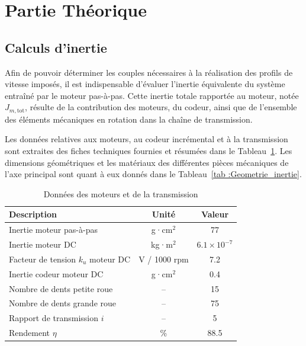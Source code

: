 \section{Partie Théorique}
\subsection{Calculs d'inertie}
Afin de pouvoir déterminer les couples nécessaires à la réalisation des profils de vitesse imposés, il est indispensable d’évaluer l’inertie équivalente du système entraîné par le moteur pas-à-pas. Cette inertie totale rapportée au moteur, notée $J_{m,\text{tot}}$, résulte de la contribution des moteurs, du codeur, ainsi que de l’ensemble des éléments mécaniques en rotation dans la chaîne de transmission.

Les données relatives aux moteurs, au codeur incrémental et à la transmission sont extraites des fiches techniques fournies et résumées dans le Tableau~\ref{tab :donnees_moteur}. Les dimensions géométriques et les matériaux des différentes pièces mécaniques de l’axe principal sont quant à eux donnés dans le Tableau~\ref{tab :Geometrie_inertie}.
\begin{table}[h!]
\centering
\begin{tabular}{|l| c| c|}
\hline
Description & Unité & Valeur \\
\hline
Inertie moteur pas-à-pas & g·cm$^2$ & 77 \\
\hline
Inertie moteur DC & kg·m$^2$ & $6.1 \times 10^{-7}$ \\
\hline
Facteur de tension $k_u$ moteur DC & V / 1000 rpm & 7.2 \\
\hline
Inertie codeur moteur DC & g·cm$^2$ & 0.4 \\
\hline
Nombre de dents petite roue & -- & 15 \\
\hline
Nombre de dents grande roue & -- & 75 \\
\hline
Rapport de transmission $i$ & -- & 5 \\
\hline
Rendement $\eta$ & \% & 88.5 \\
\hline
\end{tabular}
\caption{Données des moteurs et de la transmission}
\label{tab :donnees_moteur}
\end{table}
